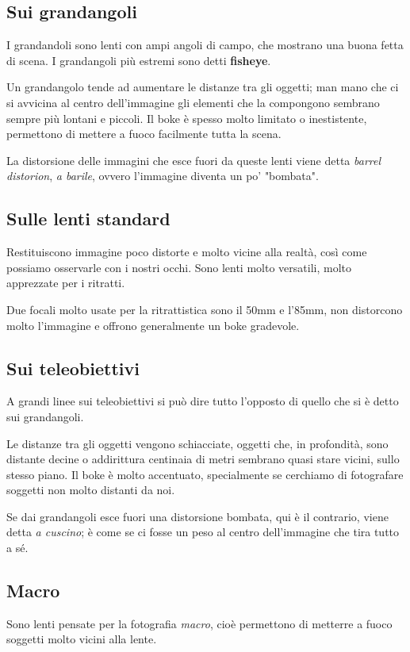 \subsection{Sui grandangoli} \label{subsec:suigrandandoli}
I grandandoli sono lenti con ampi angoli di campo, che mostrano una buona fetta di scena. I grandangoli più estremi sono detti \textbf{fisheye}.

Un grandangolo tende ad aumentare le distanze tra gli oggetti; man mano che ci si avvicina al centro dell'immagine gli elementi che la compongono sembrano sempre più lontani e piccoli.
Il boke è spesso molto limitato o inestistente, permettono di mettere a fuoco facilmente tutta la scena.

La distorsione delle immagini che esce fuori da queste lenti viene detta \textit{barrel distorion}, \textit{a barile}, ovvero l'immagine diventa un po' "bombata".


\subsection{Sulle lenti standard} \label{subsec:sullestandard}
Restituiscono immagine poco distorte e molto vicine alla realtà, così come possiamo osservarle con i nostri occhi. Sono lenti molto versatili, molto apprezzate per i ritratti.

Due focali molto usate per la ritrattistica sono il 50mm e l'85mm, non distorcono molto l'immagine e offrono generalmente un boke gradevole.


\subsection{Sui teleobiettivi} \label{subsec:suitele}
A grandi linee sui teleobiettivi si può dire tutto l'opposto di quello che si è detto sui grandangoli.

Le distanze tra gli oggetti vengono schiacciate, oggetti che, in profondità, sono distante decine o addirittura centinaia di metri sembrano quasi stare vicini, sullo stesso piano.\newline
Il boke è molto accentuato, specialmente se cerchiamo di fotografare soggetti non molto distanti da noi.

Se dai grandangoli esce fuori una distorsione bombata, qui è il contrario, viene detta \textit{a cuscino}; è come se ci fosse un peso al centro dell'immagine che tira tutto a sé.


\subsection{Macro} \label{subsec:lentimacro}
Sono lenti pensate per la fotografia \textit{macro}, cioè permettono di metterre a fuoco soggetti molto vicini alla lente.

